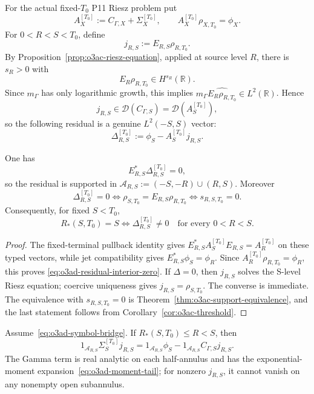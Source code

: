For the actual fixed-\(T_0\) P11 Riesz problem put
\[
 A_X^{[T_0]}:=C_{\Gamma,X}+\Sigma_X^{[T_0]},
 \qquad
 A_X^{[T_0]}\rho_{X,T_0}=\phi_X.
\]
For \(0<R<S<T_0\), define
\[
 j_{R,S}:=E_{R,S}\rho_{R,T_0}.
\tag{O3AD.6}\label{eq:o3ad-inherited-riesz}
\]
By Proposition~\ref{prop:o3ac-riesz-equation}, applied at source level \(R\), there is
\(s_R>0\) with
\[
 E_R\rho_{R,T_0}\in H^{s_R}(\mathbb R).
\]
Since \(m_\Gamma\) has only logarithmic growth, this implies
\(m_\Gamma\widehat{E_R\rho_{R,T_0}}\in L^2(\mathbb R)\).  Hence
\[
 j_{R,S}\in\mathcal D(C_{\Gamma,S})
 =\mathcal D(A_S^{[T_0]}),
\]
so the following residual is a genuine \(L^2(-S,S)\) vector:
\[
 \boxed{
 \Delta_{R,S}^{[T_0]}
 :=\phi_S-A_S^{[T_0]}j_{R,S}.
 }
\tag{O3AD.7}\label{eq:o3ad-annular-residual}
\]

\begin{theorem}
\label{thm:o3ad-annular-gate}
One has
\[
 E_{R,S}^*\Delta_{R,S}^{[T_0]}=0,
\tag{O3AD.8}\label{eq:o3ad-residual-interior-zero}
\]
so the residual is supported in
\(\mathcal A_{R,S}:=(-S,-R)\cup(R,S)\).  Moreover
\[
 \boxed{
 \Delta_{R,S}^{[T_0]}=0
 \iff
 \rho_{S,T_0}=E_{R,S}\rho_{R,T_0}
 \iff
 s_{R,S,T_0}=0.
 }
\tag{O3AD.9}\label{eq:o3ad-cancellation-equivalence}
\]
Consequently, for fixed \(S<T_0\),
\[
 \boxed{
 R_*(S,T_0)=S
 \iff
 \Delta_{R,S}^{[T_0]}\ne0
 \quad\text{for every }0<R<S.
 }
\tag{O3AD.10}\label{eq:o3ad-Rstar-gate}
\]
\end{theorem}

\begin{proof}
The fixed-terminal pullback identity gives
\(E_{R,S}^*A_S^{[T_0]}E_{R,S}=A_R^{[T_0]}\) on these typed vectors, while jet
compatibility gives \(E_{R,S}^*\phi_S=\phi_R\).  Since
\(A_R^{[T_0]}\rho_{R,T_0}=\phi_R\), this proves
\eqref{eq:o3ad-residual-interior-zero}.
If \(\Delta=0\), then \(j_{R,S}\) solves the S-level Riesz equation; coercive
uniqueness gives \(j_{R,S}=\rho_{S,T_0}\).  The converse is immediate.  The equivalence
with \(s_{R,S,T_0}=0\) is Theorem~\ref{thm:o3ac-support-equivalence}, and the last
statement follows from Corollary~\ref{cor:o3ac-threshold}.
\end{proof}

\begin{corollary}
\label{cor:o3ad-forced-cancellation}
Assume~\eqref{eq:o3ad-symbol-bridge}.  If \(R_*(S,T_0)\le R<S\), then
\[
 \boxed{
 1_{\mathcal A_{R,S}}\Sigma_S^{[T_0]}j_{R,S}
 =1_{\mathcal A_{R,S}}\phi_S
 -1_{\mathcal A_{R,S}}C_{\Gamma,S}j_{R,S}.
 }
\tag{O3AD.11}\label{eq:o3ad-forced-cancellation}
\]
The Gamma term is real analytic on each half-annulus and has the exponential-moment
expansion~\eqref{eq:o3ad-moment-tail}; for nonzero \(j_{R,S}\), it cannot vanish on any
nonempty open subannulus.
\end{corollary}

